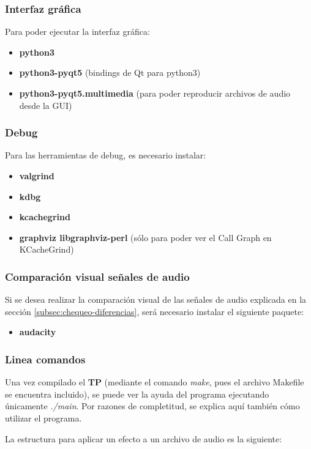 \documentclass[a4paper,spanish,12pt]{article}
\begin{document}
\subsubsection*{Interfaz gráfica}
Para poder ejecutar la interfaz gráfica:
\begin{itemize}
 \item \textbf{python3}
 \item \textbf{python3-pyqt5} (bindings de Qt para python3)
 \item \textbf{python3-pyqt5.multimedia} (para poder reproducir archivos de audio desde la GUI)
\end{itemize}

\subsubsection*{Debug}
Para las herramientas de debug, es necesario instalar:
\begin{itemize}
 \item \textbf{valgrind}
 \item \textbf{kdbg}
 \item \textbf{kcachegrind}
 \item \textbf{graphviz libgraphviz-perl} (sólo para poder ver el Call Graph en KCacheGrind)
\end{itemize}

\subsubsection*{Comparación visual señales de audio}
Si se desea realizar la comparación visual de las señales de audio explicada en la sección \ref{subsec:chequeo-diferencias}, será necesario instalar el siguiente paquete:
\begin{itemize}
 \item \textbf{audacity}
\end{itemize}

\newpage\subsubsection{Linea comandos}
\label{subsec:cli}
Una vez compilado el \textbf{TP} (mediante el comando \textit{make}, pues el archivo Makefile se encuentra incluido), se puede ver la ayuda del programa ejecutando únicamente \textit{./main}. Por razones de completitud, se explica aquí también cómo utilizar el programa. \vspace{\baselineskip}

La estructura para aplicar un efecto a un archivo de audio es la siguiente:
\end{document}
